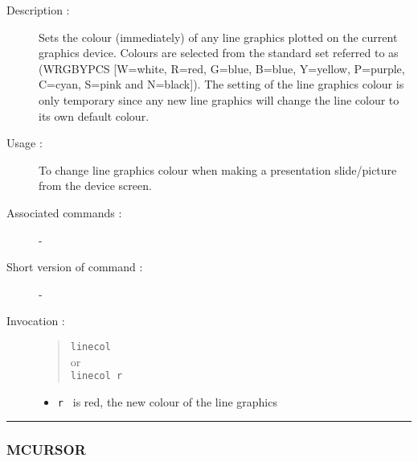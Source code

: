 \begin{description}

\item[Description :] Sets the colour (immediately) of any line graphics
plotted on the current graphics device.  Colours are selected from the
standard set referred to as (WRGBYPCS [W=white, R=red, G=blue, B=blue,
Y=yellow, P=purple, C=cyan, S=pink and N=black]).  The setting of the
line graphics colour is only temporary since any new line graphics will
change the line colour to its own default colour.  

\item[Usage :] To change line graphics colour when making a 
presentation slide/picture from the device screen.
\item[Associated commands :] -
\item[Short version of command :] -
\item[Invocation :]

\begin{quote}{\tt  linecol }\\
or \\
{\tt linecol r }
\end{quote}

\begin{itemize}

\item {\tt r } is red, the new colour of the line graphics
\end{itemize}

\end{description}

\hrule 
\subsubsection*{\label{MCURSOR}MCURSOR}

